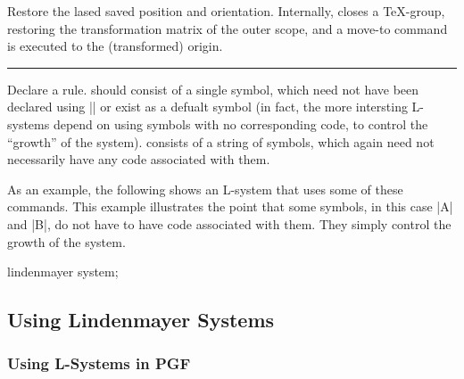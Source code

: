\begin{command}{\pgfdeclarelindenmayersystem{}}
\begin{command}{\symbol{}}
\begin{command}{\pgflsystemrestorestate}
	Restore the lased saved position and orientation. Internally,
	\pgfname{} closes a \TeX-group, restoring the transformation 
	matrix of the outer scope, and a move-to command is executed to
	the (transformed) origin.
\end{command}
  

\end{command}

\begin{command}{\rule{\ttfamily\char`\{}}
  Declare a rule.  should consist of a single symbol, which
  need not have been declared using |\symbol| or exist as a defualt
  symbol (in fact, the more intersting L-systems depend on using
  symbols with no corresponding code, to control the ``growth'' of the
  system).
 	 consists of a string of symbols, which again need not
 	necessarily have any code associated with them.
 	
\end{command}

  As an example, the following shows an L-system that uses
  some of these commands. This example illustrates the point
  that some symbols, in this case |A| and |B|, do not have to 
  have code associated with them. They simply control the
  growth of the system.

\begin{codeexample}[pre={\nullfont\expandafter\let\csname pgf@lsystem@Hilbert curve\endcsname=\relax}]
\tikz\draw[lindenmayer system={Hilbert curve, axiom=A, order=4, angle=90}]
  lindenmayer system;
\end{codeexample}


\end{command}

\subsection{Using Lindenmayer Systems}
\subsubsection{Using L-Systems in PGF}

